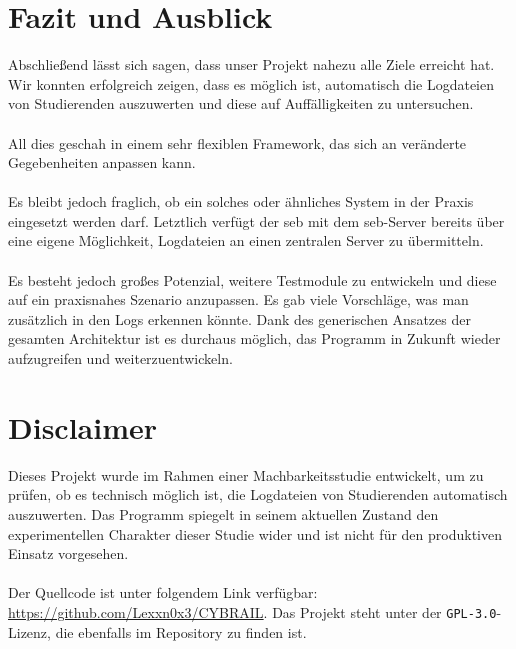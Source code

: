 \chapter{Fazit und Ausblick} \label{ch:fazit}
Abschließend lässt sich sagen, dass unser Projekt nahezu alle Ziele erreicht hat. 
Wir konnten erfolgreich zeigen, dass es möglich ist, automatisch die Logdateien von Studierenden auszuwerten und diese auf Auffälligkeiten zu untersuchen.\\
\\
All dies geschah in einem sehr flexiblen Framework, das sich an veränderte Gegebenheiten anpassen kann.\\
\\
Es bleibt jedoch fraglich, ob ein solches oder ähnliches System in der Praxis eingesetzt werden darf. 
Letztlich verfügt der \gls{seb} mit dem \gls{seb}-Server bereits über eine eigene Möglichkeit, Logdateien an einen zentralen Server zu übermitteln.\\
\\
Es besteht jedoch großes Potenzial, weitere Testmodule zu entwickeln und diese auf ein praxisnahes Szenario anzupassen. 
Es gab viele Vorschläge, was man zusätzlich in den Logs erkennen könnte. 
Dank des generischen Ansatzes der gesamten Architektur ist es durchaus möglich, das Programm in Zukunft wieder aufzugreifen und weiterzuentwickeln.

\chapter*{Disclaimer} 
Dieses Projekt wurde im Rahmen einer Machbarkeitsstudie entwickelt, um zu prüfen, ob es technisch möglich ist, die Logdateien von Studierenden automatisch auszuwerten. 
Das Programm spiegelt in seinem aktuellen Zustand den experimentellen Charakter dieser Studie wider und ist nicht für den produktiven Einsatz vorgesehen.\\
\\
Der Quellcode ist unter folgendem Link verfügbar: \href{https://github.com/Lexxn0x3/CYBRAIL}{https://github.com/Lexxn0x3/CYBRAIL}. 
Das Projekt steht unter der \texttt{GPL-3.0}-Lizenz, die ebenfalls im Repository zu finden ist.
